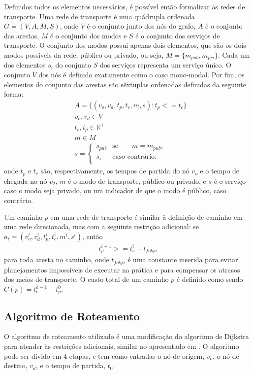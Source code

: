 Definidos todos os elementos necessários, é possível então formalizar as redes de transporte. Uma rede de transporte é uma quádrupla ordenada $G = (V, A, M, S)$, onde $V$ é o conjunto junto dos nós do grafo, $A$ é o conjunto das arestas, $M$ é o conjunto dos modos e $S$ é o conjunto dos serviços de transporte. O conjunto dos modos possui apenas dois elementos, que são os dois modos possíveis da rede, público ou privado, ou seja, $M = \{m_{pub}, m_{pri}\}$.
Cada um dos elementos $s_i$ do conjunto $S$ dos serviços representa um serviço único.
O conjunto $V$ dos nós é definido exatamente como o caso mono-modal. Por fim, os elementos do conjunto das arestas são sêxtuplas ordenadas definidas da seguinte forma:
\begin{align*}
& A = \{ (v_o, v_d, t_p, t_c, m, s) : t_p <= t_c \} \\
& v_o, v_d \in V \\
& t_c, t_p \in \mathbb{R^+} \\
& m \in M \\
& s = \left\{
	\begin{array}{cl}
		s_{pub} &  \text{se} \qquad m = m_{pub}, \\
		s_i  & \text{caso contrário}. \\
	\end{array}
	\right.
\end{align*}
onde $t_p$ e $t_c$ são, respectivamente, os tempos de partida do nó $v_o$ e o tempo de chegada no nó $v_2$, $m$ é o modo de transporte, público ou privado, e $s$ é o serviço caso o modo seja privado, ou um indicador de que o modo é público, caso contrário.

Um caminho $p$ em uma rede de transporte é similar ã definição de caminho em uma rede direcionada, mas com a seguinte restrição adicional: se $a_i = (v_o^i, v_d^i, t_p^i, t_c^i, m^i, s^i)$, então
\begin{align*}
t_p^{i+1} >= t_c^i + t_{folga}
\end{align*}
para toda aresta no caminho, onde $t_{folga}$ é uma constante inserida para evitar planejamentos impossíveis de executar na prática e para compensar os atrasos dos meios de transporte. 
O custo total de um caminho $p$ é definido como sendo $C(p) = t_c^{k-1} - t_p^0$.

\subsection{Algoritmo de Roteamento}

O algoritmo de roteamento utilizado é uma modificação do algoritmo de Dijkstra para atender às restrições adicionais, similar ao apresentado em \cite{kao2008}. O algoritmo pode ser divido em 4 etapas, e tem como entradas o nó de origem, $v_o$, o nó de destino, $v_d$, e o tempo de partida, $t_0$.

